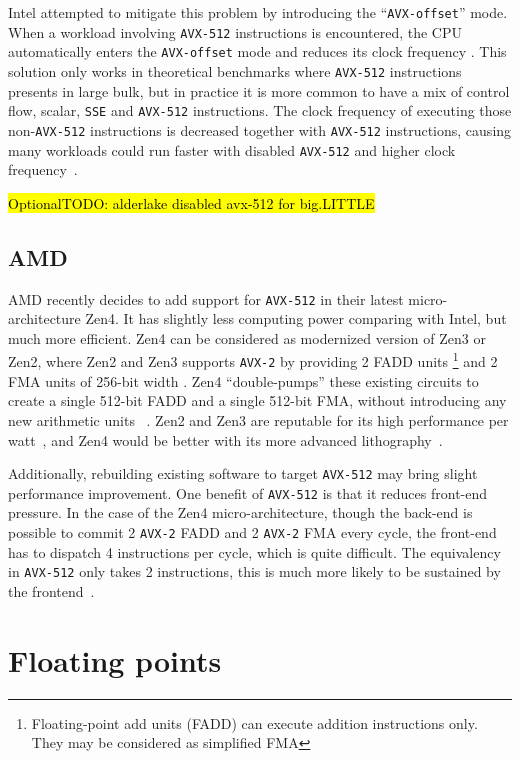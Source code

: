 \documentclass[logo,bsc,singlespacing,parskip]{infthesis}
\newcommand{\hlc}[2][yellow]{{%
    \colorlet{foo}{#1}%
    \sethlcolor{foo}\hl{#2}}%
}
\begin{document}
Intel attempted to mitigate this problem by introducing the
``\texttt{AVX-offset}'' mode. When a workload involving \texttt{AVX-512}
instructions is encountered, the CPU automatically enters the
\texttt{AVX-offset} mode and reduces its clock frequency \cite{AVX-offset}. This
solution only works in theoretical benchmarks where \texttt{AVX-512}
instructions presents in large bulk, but in practice it is more common to have a
mix of control flow, scalar, \texttt{SSE} and \texttt{AVX-512} instructions. The
clock frequency of executing those non-\texttt{AVX-512} instructions is
decreased together with \texttt{AVX-512} instructions, causing many workloads
could run faster with disabled \texttt{AVX-512} and higher clock
frequency~\cite{Zen4Critique}. 

\hlc[pink]{OptionalTODO: alderlake disabled avx-512 for big.LITTLE}


\subsection{AMD}
AMD recently decides to add support for \texttt{AVX-512} in their latest
micro-architecture Zen4. It has slightly less computing power comparing with
Intel, but much more efficient. Zen4 can be considered as modernized version of
Zen3 or Zen2, where Zen2 and Zen3 supports \texttt{AVX-2}  by providing 2 FADD
units \footnote{Floating-point add units (FADD) can execute addition
instructions only. They may be considered as simplified FMA} and 2 FMA units of
256-bit width \cite{Zen2ChipWiki}. Zen4 ``double-pumps'' these existing circuits
to create a single 512-bit FADD and a single 512-bit FMA, without introducing
any new arithmetic units ~\cite{Zen4Critique}. Zen2 and Zen3 are reputable for
its high performance per watt~\cite{ZenPerfPerWatt}, and Zen4 would be better
with its more advanced lithography~\cite{Zen4Critique}.

Additionally, rebuilding existing software to target \texttt{AVX-512} may bring
slight performance improvement. One benefit of \texttt{AVX-512} is that it
reduces front-end pressure. In the case of the Zen4 micro-architecture, though
the back-end is possible to commit 2 \texttt{AVX-2} FADD and 2 \texttt{AVX-2}
FMA every cycle, the front-end has to dispatch 4 instructions per cycle, which
is quite difficult. The equivalency in \texttt{AVX-512} only takes 2
instructions, this is much more likely to be sustained by the
frontend~\cite{Zen4Critique}.


\section{Floating points}
\label{sec:i23}
\end{document}
